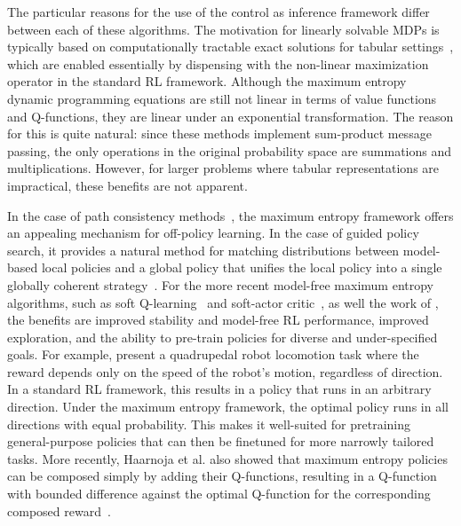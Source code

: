 The particular reasons for the use of the control as inference framework differ between each of these algorithms. The motivation for linearly solvable MDPs is typically based on computationally tractable exact solutions for tabular settings~\citep{lmdp_policy}, which are enabled essentially by dispensing with the non-linear maximization operator in the standard RL framework. Although the maximum entropy dynamic programming equations are still not linear in terms of value functions and Q-functions, they are linear under an exponential transformation. The reason for this is quite natural: since these methods implement sum-product message passing, the only operations in the original probability space are summations and multiplications. However, for larger problems where tabular representations are impractical, these benefits are not apparent.

In the case of path consistency methods~\citep{pcl,trust_pcl}, the maximum entropy framework offers an appealing mechanism for off-policy learning. In the case of guided policy search, it provides a natural method for matching distributions between model-based local policies and a global policy that unifies the local policy into a single globally coherent strategy~\citep{cgps,mfgps,endtoend}. For the more recent model-free maximum entropy algorithms, such as soft Q-learning~\citep{haarnoja} and soft-actor critic~\citep{sac}, as well the work of \citet{hausman}, the benefits are improved stability and model-free RL performance, improved exploration, and the ability to pre-train policies for diverse and under-specified goals. For example, \citet{haarnoja} present a quadrupedal robot locomotion task where the reward depends only on the speed of the robot's motion, regardless of direction. In a standard RL framework, this results in a policy that runs in an arbitrary direction. Under the maximum entropy framework, the optimal policy runs in all directions with equal probability. This makes it well-suited for pretraining general-purpose policies that can then be finetuned for more narrowly tailored tasks. More recently, Haarnoja et al. also showed that maximum entropy policies can be composed simply by adding their Q-functions, resulting in a Q-function with bounded difference against the optimal Q-function for the corresponding composed reward~\citep{haarnoja_composable}.

